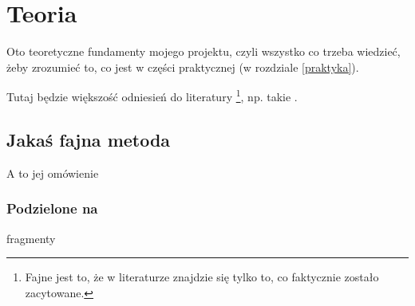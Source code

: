 \chapter{Teoria}
\label{teoria} 

Oto teoretyczne fundamenty mojego projektu, czyli wszystko co trzeba wiedzieć, żeby
zrozumieć to, co jest w części praktycznej (w rozdziale \ref{praktyka}).

Tutaj będzie większość odniesień do literatury
\footnote{Fajne jest to, że w literaturze znajdzie się tylko to, co faktycznie zostało 
zacytowane.}, np. takie .

\section{Jakaś fajna metoda}

A to jej omówienie

\subsection{Podzielone na}

fragmenty


